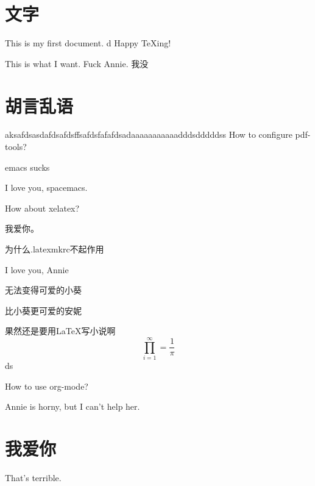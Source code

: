\message{ !name(try_latex.tex)}\documentclass[UTF8]{ctexart}
\begin{document}


\section{文字}
This is my first document.
d
Happy \TeX ing!


This is what I want.
Fuck Annie.
我没 

\section{胡言乱语}

aksafdsasdafdsafdsffsafdsfafafdsadaaaaaaaaaaadddsdddddss
How to configure pdf-tools?

emacs sucks

I love you, spacemacs.


How about xelatex?

我爱你。

为什么.latexmkrc不起作用

I love you, Annie

无法变得可爱的小葵

比小葵更可爱的安妮

果然还是要用\LaTeX 写小说啊 \\

\begin{equation}
  \prod_{i=1}^{\infty}=\frac{1}{\pi}
  \end{equation}
  ds

How to use org-mode?

Annie is horny, but I can't help her.






\section{我爱你}
That's terrible.
\end{document}
